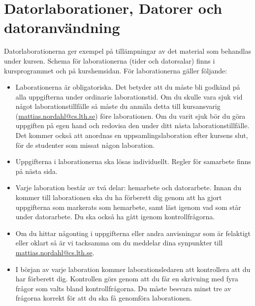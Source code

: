 \documentclass[fleqn, article, a4paper]{memoir}
\begin{document}
\maketitle
\thispagestyle{titlepage}
\vspace{-4cm}
\section*{Datorlaborationer, Datorer och datoranvändning}

Datorlaborationerna ger exempel på tillämpningar av det material som behandlas under kursen. Schema för laborationerna (tider och datorsalar) finns i kursprogrammet och på kurshemsidan. För laborationerna gäller följande:

\begin{itemize}
	\item Laborationerna är obligatoriska. Det betyder att du måste bli godkänd på alla uppgifterna under ordinarie laborationstid. Om du skulle vara sjuk vid något laborationstillfälle så måste du anmäla detta till kursansvarig (\url{mattias.nordahl@cs.lth.se}) före laborationen. Om du varit sjuk bör du göra uppgiften på egen hand och redovisa den under ditt nästa laborationstillfälle. Det kommer också att anordnas en uppsamlingslaboration efter kursens slut, för de studenter som missat någon laboration.

	\item Uppgifterna i laborationerna ska lösas individuellt. Regler för samarbete finns på nästa sida.

	\item Varje laboration består av två delar: hemarbete och datorarbete. Innan du kommer till laborationen ska du ha förberett dig genom att ha gjort uppgifterna som markerats som hemarbete, samt läst igenom vad som står under datorarbete. Du ska också ha gått igenom kontrollfrågorna.

	\item Om du hittar någonting i uppgifterna eller andra anvisningar som är felaktigt eller oklart så är vi tacksamma om du meddelar dina synpunkter till \url{mattias.nordahl@cs.lth.se}.


	\item I början av varje laboration kommer laborationsledaren att kontrollera att du har förberett dig. Kontrollen görs genom att du får en skrivning med fyra frågor som valts bland kontrollfrågorna. Du måste besvara minst tre av frågorna korrekt för att du ska få genomföra laborationen.


\end{itemize}
\end{document}
